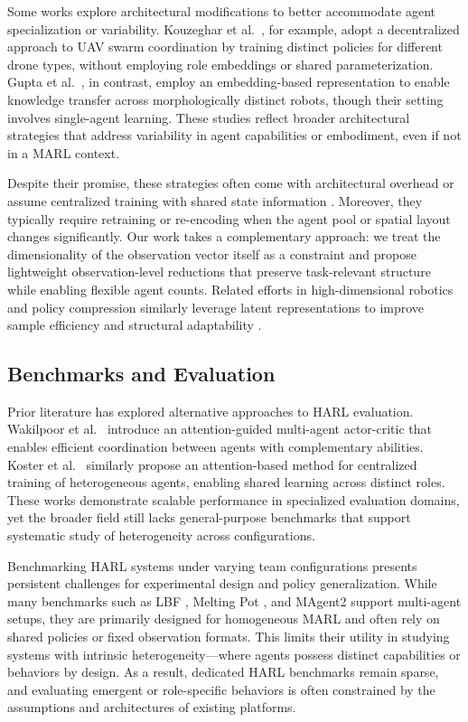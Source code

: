 \documentclass{article}
\begin{document}
Some works explore architectural modifications to better accommodate agent specialization 
or variability. Kouzeghar et al.~\cite{kouzeghar2023}, for example, adopt a decentralized 
approach to UAV swarm coordination by training distinct policies for different drone types, 
without employing role embeddings or shared parameterization. 
Gupta et al.~\cite{gupta2017a}, in contrast, employ an embedding-based representation to 
enable knowledge transfer across morphologically distinct robots, though their setting 
involves single-agent learning. These studies reflect broader architectural strategies that 
address variability in agent capabilities or embodiment, even if not in a MARL context.

Despite their promise, these strategies often come with architectural overhead or assume 
centralized training with shared state information \cite{foerster2017}. 
Moreover, they typically require retraining or re-encoding when the agent pool or spatial 
layout changes significantly. Our work takes a complementary approach: 
we treat the dimensionality of the observation vector itself as a constraint and propose 
lightweight observation-level reductions that preserve task-relevant structure 
while enabling flexible agent counts. 
Related efforts in high-dimensional robotics and policy compression similarly leverage 
latent representations to improve sample efficiency and structural adaptability 
\cite{bitzer2010, tangkaratt2016}.

\subsection{Benchmarks and Evaluation}

Prior literature has explored alternative approaches to HARL evaluation. 
Wakilpoor et al.~\cite{wakilpoor2020} introduce an attention-guided multi-agent actor-critic 
that enables efficient coordination between agents with complementary abilities. 
Koster et al.~\cite{koster2020} similarly propose an attention-based method for centralized 
training of heterogeneous agents, enabling shared learning across distinct roles. 
These works demonstrate scalable performance in specialized evaluation domains, 
yet the broader field still lacks general-purpose benchmarks that support systematic 
study of heterogeneity across configurations.

Benchmarking HARL systems under varying team configurations presents persistent
challenges for experimental design and policy generalization. While many benchmarks 
such as LBF \cite{papoudakis2021}, Melting Pot \cite{leibo2021}, and MAgent2 \cite{zheng2017} 
support multi-agent setups, they are primarily designed for homogeneous MARL 
and often rely on shared policies or fixed observation formats. This limits 
their utility in studying systems with intrinsic heterogeneity—where agents possess 
distinct capabilities or behaviors by design. As a result, dedicated HARL benchmarks 
remain sparse, and evaluating emergent or role-specific behaviors is often constrained 
by the assumptions and architectures of existing platforms.
\end{document}
